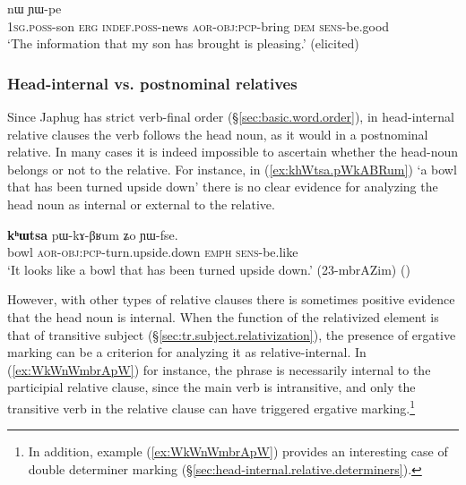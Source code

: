 \begin{exe}
\ex \label{ex:tWtCha.jAkAGWt}
 nɯ ɲɯ-pe \\
\textsc{1sg}.\textsc{poss}-son \textsc{erg} \textsc{indef}.\textsc{poss}-news \textsc{aor}-\textsc{obj}:\textsc{pcp}-bring \textsc{dem} \textsc{sens}-be.good \\
\glt `The information that my son has brought is pleasing.' (elicited)
\end{exe} 
  
\subsubsection{Head-internal vs. postnominal relatives} \label{sec:head-internal.relative.postnominal}
 
Since Japhug has strict verb-final order (§\ref{sec:basic.word.order}), in head-internal relative clauses the verb follows the head noun, as it would in a postnominal relative. In many cases it is indeed impossible to ascertain whether the head-noun belongs or not to the relative. For instance, in (\ref{ex:khWtsa.pWkABRum})  `a bowl that has been turned upside down' there is no clear evidence for analyzing the head noun  as internal or external to the relative. 
  
\begin{exe}
\ex  \label{ex:khWtsa.pWkABRum}
\gll \textbf{kʰɯtsa} pɯ-kɤ-βʁum ʑo ɲɯ-fse. \\
bowl \textsc{aor}-\textsc{obj}:\textsc{pcp}-turn.upside.down \textsc{emph} \textsc{sens}-be.like \\
\glt `It looks like a bowl that has been turned upside down.' (23-mbrAZim)
()
\end{exe} 

However,  with other types of relative clauses there is sometimes positive evidence that the head noun is internal. When the function of the relativized element is that of transitive subject (§\ref{sec:tr.subject.relativization}), the presence of ergative marking can be a criterion for analyzing it as relative-internal. In (\ref{ex:WkWnWmbrApW}) for instance, the phrase  is necessarily internal to the participial relative clause, since the main verb  is intransitive, and only the transitive verb  in the relative clause can have triggered ergative marking.\footnote{In addition, example (\ref{ex:WkWnWmbrApW}) provides an interesting case of double determiner marking (§\ref{sec:head-internal.relative.determiners}). } 
  
